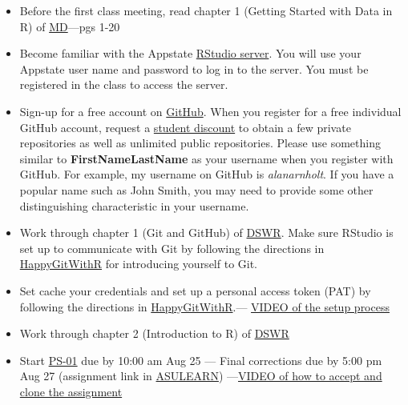 \documentclass[
]{article}
\begin{document}
\begin{itemize}
\item
  Before the first class meeting, read chapter 1 (Getting Started with
  Data in R) of \href{https://moderndive.com}{MD}---pgs 1-20
\item
  Become familiar with the Appstate
  \href{https://mathr.math.appstate.edu/}{RStudio server}. You will use
  your Appstate user name and password to log in to the server. You must
  be registered in the class to access the server.
\item
  Sign-up for a free account on \href{https://github.com}{GitHub}. When
  you register for a free individual GitHub account, request a
  \href{https://education.github.com}{student discount} to obtain a few
  private repositories as well as unlimited public repositories. Please
  use something similar to \textbf{FirstNameLastName} as your username
  when you register with GitHub. For example, my username on GitHub is
  \emph{alanarnholt}. If you have a popular name such as John Smith, you
  may need to provide some other distinguishing characteristic in your
  username.
\item
  Work through chapter 1 (Git and GitHub) of
  \href{https://stat-ata-asu.github.io/R_DS_BD2020/}{DSWR}. Make sure
  RStudio is set up to communicate with Git by following the directions
  in \href{https://happygitwithr.com/hello-git.html}{HappyGitWithR} for
  introducing yourself to Git.
\item
  Set cache your credentials and set up a personal access token (PAT) by
  following the directions in
  \href{https://happygitwithr.com/credential-caching.html}{HappyGitWithR}.---
  \href{https://drive.google.com/file/d/1G9G8IeYu9QetYB1nxMmAFLgRtw5YC-c8/view?usp=sharing}{VIDEO
  of the setup process}
\item
  Work through chapter 2 (Introduction to R) of
  \href{https://stat-ata-asu.github.io/R_DS_BD2020/}{DSWR}
\item
  Start
  \href{https://classroom.github.com/classrooms/87543903-stt3850-fall2021}{PS-01}
  due by 10:00 am Aug 25 --- Final corrections due by 5:00 pm Aug 27
  (assignment link in
  \href{https://asulearn.appstate.edu/course/view.php?id=131169}{ASULEARN})
  ---\href{https://drive.google.com/file/d/1MfDjhNb5m_45BCVD6ZQCXhgIMWwwx0oS/view?usp=sharing}{VIDEO
  of how to accept and clone the assignment}
\end{itemize}
\end{document}
